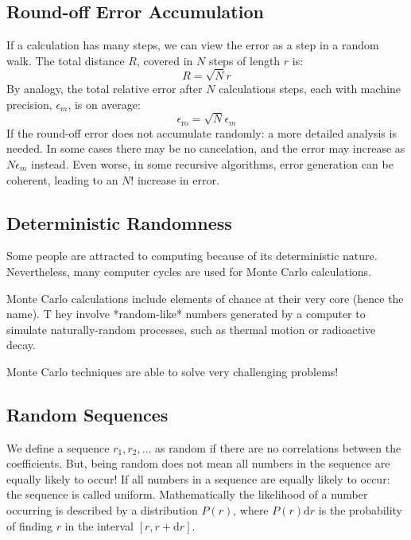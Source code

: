 \documentclass[../../../main.tex]{subfiles}
\begin{document}
\subsection{Round-off Error Accumulation}
If a calculation has many steps, we can view the error as a step in a random walk. 
The total distance $R$, covered in $N$ steps of length $r$ is:
\begin{equation*}
    R = \sqrt{N} r
\end{equation*}
By analogy, the total relative error after $N$ calculations steps, each with machine precision, $\epsilon_m$, is on average:
\begin{equation*}
    \epsilon_\mathrm{ro} = \sqrt{N} \epsilon_m
\end{equation*}
If the round-off error does not accumulate randomly: a more detailed analysis is needed. 
In some cases there may be no cancelation, and the error may increase as $N \epsilon_m$ instead. 
Even worse, in some recursive algorithms, error generation can be coherent, leading to an $N!$ increase in error. 

\subsection{Deterministic Randomness}

Some people are attracted to computing because of its deterministic nature. 
Nevertheless, many computer cycles are used for Monte Carlo calculations. 

Monte Carlo calculations include elements of chance at their very core (hence the name). T
hey involve *random-like* numbers generated by a computer to simulate naturally-random processes, such as thermal motion or radioactive decay. 

Monte Carlo techniques are able to solve very challenging problems!

\subsection{Random Sequences}

We define a sequence $r_1, r_2,...$ as random if there are no correlations between the coefficients. 
But, being random does not mean all numbers in the sequence are equally likely to occur! 
If all numbers in a sequence are equally likely to occur: the sequence is called uniform.
Mathematically the likelihood of a number occurring is described by a distribution $P(r)$, where $P(r)\mathrm{d}r$ is the probability of finding $r$ in the interval $[r, r+\mathrm{d}r]$. 
\end{document}
